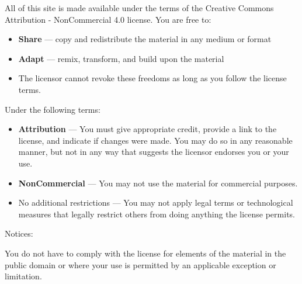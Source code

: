 \documentclass{scrbook}
\begin{document}
All of this site is made available under the terms of the Creative Commons
Attribution - NonCommercial 4.0 license. You are free to:

\begin{itemize}

\item 

\textbf{Share} — copy and redistribute the material in any medium or format



\item 

\textbf{Adapt} — remix, transform, and build upon the material



\item 

The licensor cannot revoke these freedoms as long as you follow the license
    terms.



\end{itemize}


Under the following terms:

\begin{itemize}

\item 

\textbf{Attribution} — You must give appropriate credit, provide a link to the
    license, and indicate if changes were made. You may do so in any reasonable
    manner, but not in any way that suggests the licensor endorses you or your
    use.



\item 

\textbf{NonCommercial} — You may not use the material for commercial purposes.



\item 

No additional restrictions — You may not apply legal terms or technological
    measures that legally restrict others from doing anything the license
    permits.



\end{itemize}


Notices:


You do not have to comply with the license for elements of the material in the
public domain or where your use is permitted by an applicable exception or
limitation.
\end{document}

